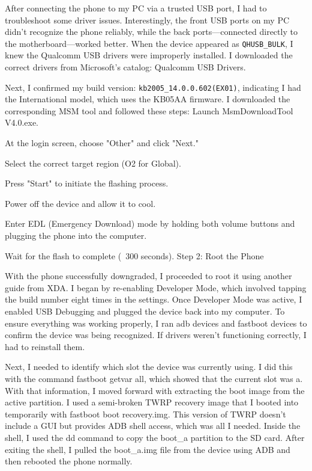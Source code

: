 After connecting the phone to my PC via a trusted USB port, I had to troubleshoot some driver issues. Interestingly, the front USB ports on my PC didn’t recognize the phone reliably, while the back ports—connected directly to the motherboard—worked better. When the device appeared as \texttt{QHUSB\_BULK}, I knew the Qualcomm USB drivers were improperly installed. I downloaded the correct drivers from Microsoft’s catalog: Qualcomm USB Drivers.

Next, I confirmed my build version: \texttt{kb2005\_14.0.0.602(EX01)}, indicating I 
had the International model, which uses the KB05AA firmware. I downloaded the corresponding MSM tool and followed these steps:
Launch MsmDownloadTool V4.0.exe.


At the login screen, choose "Other" and click "Next."


Select the correct target region (O2 for Global).


Press "Start" to initiate the flashing process.


Power off the device and allow it to cool.


Enter EDL (Emergency Download) mode by holding both volume buttons and plugging the phone into the computer.


Wait for the flash to complete (~300 seconds).
Step 2: Root the Phone

With the phone successfully downgraded, I proceeded to root it using another guide 
from XDA. I began by re-enabling Developer Mode, which involved tapping the build number eight times in the settings. Once Developer Mode was active, I enabled USB Debugging and plugged the device back into my computer. To ensure everything was working properly, I ran adb devices and fastboot devices to confirm the device was being recognized. If drivers weren’t functioning correctly, I had to reinstall them.

Next, I needed to identify which slot the device was currently using. I did this with the command fastboot getvar all, which showed that the current slot was a. With that information, I moved forward with extracting the boot image from the active partition. I used a semi-broken TWRP recovery image that I booted into temporarily with fastboot boot recovery.img. This version of TWRP doesn’t include a GUI but provides ADB shell access, which was all I needed. Inside the shell, I used the dd command to copy the boot\_a partition to the SD card. After exiting the shell, I pulled the boot\_a.img file from the device using ADB and then rebooted the phone normally.

